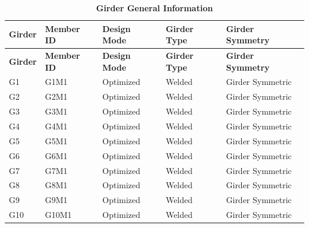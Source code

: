 \documentclass[12pt,a4paper]{report}
\numberwithin{table}{chapter}
\numberwithin{figure}{chapter}
\newcommand{\ReportTableRowGap}{6pt}
\begin{document}
\newpage

\vspace{0.4em}
\noindent
            
\vspace{4pt}
\begin{longtable}{|L{2.2cm}|L{1.8cm}|p{3.8cm}|p{3.8cm}|p{3.8cm}|}
\caption{\textbf{Girder General Information}}\\
\hline
\textbf{Girder} & \textbf{Member ID} & \textbf{Design Mode} & \textbf{Girder Type} & \textbf{Girder Symmetry} \\[\ReportTableRowGap]
\hline
\endfirsthead
\hline
\textbf{Girder} & \textbf{Member ID} & \textbf{Design Mode} & \textbf{Girder Type} & \textbf{Girder Symmetry} \\[\ReportTableRowGap]
\hline
\endhead

G1 & G1M1 & Optimized & Welded & Girder Symmetric \\[8pt]
\hline
G2 & G2M1 & Optimized & Welded & Girder Symmetric \\[8pt]
\hline
G3 & G3M1 & Optimized & Welded & Girder Symmetric \\[8pt]
\hline
G4 & G4M1 & Optimized & Welded & Girder Symmetric \\[8pt]
\hline
G5 & G5M1 & Optimized & Welded & Girder Symmetric \\[8pt]
\hline
G6 & G6M1 & Optimized & Welded & Girder Symmetric \\[8pt]
\hline
G7 & G7M1 & Optimized & Welded & Girder Symmetric \\[8pt]
\hline
G8 & G8M1 & Optimized & Welded & Girder Symmetric \\[8pt]
\hline
G9 & G9M1 & Optimized & Welded & Girder Symmetric \\[8pt]
\hline
G10 & G10M1 & Optimized & Welded & Girder Symmetric \\[8pt]
\hline
\end{longtable}

\vspace{0.6em}
\end{document}
